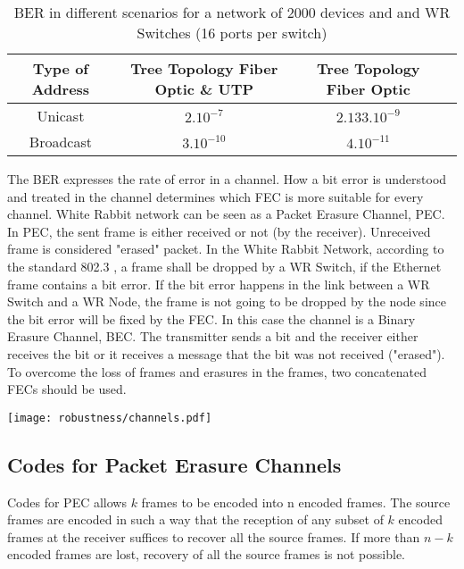 \begin{table}[!ht]
        \begin{center}
                \begin{tabular}{|c|c|c|c|}
		\hline
			 Type of Address & Tree Topology Fiber Optic \& UTP &  Tree Topology Fiber Optic \\ \hline
			 Unicast & $2.10^{-7}$   &  $ 2.133.10^{-9}$ \\ \hline 
			 Broadcast& $3.10^{-10} $ & $4.10^{-11}$ \\ \hline
		\end{tabular}
          \caption{BER in different scenarios for a network of 2000 devices and and WR Switches (16 ports per switch)}
	  \label{tab:BER_WR}
	\end{center}
\end{table}

The BER expresses the rate of error in a channel. How a bit error is
understood and treated in the channel determines which FEC is more suitable for
every channel. White Rabbit network can be seen as a Packet Erasure Channel,
PEC. In PEC, the sent frame is either received or not (by the receiver).
Unreceived frame is considered "erased" packet. In the White Rabbit
Network, according to the standard 802.3 \cite{IEEE8023}, a frame shall be
dropped by a WR Switch, if the Ethernet frame contains a bit error. If the bit
error happens in the link between a WR Switch and a WR Node, the frame is not
going to be dropped by the node since the bit error will be fixed by the FEC. In
this case the channel is a Binary Erasure Channel, BEC. The transmitter sends a
bit and the receiver either receives the bit or it receives a message that the
bit was not received ("erased"). To overcome the loss of frames and erasures in
the frames, two concatenated FECs should be used.

\begin{center}
	\texttt{[image: robustness/channels.pdf]}
	\label{fig:wr_channels}
\end{center}

\subsection{Codes for Packet Erasure Channels}

Codes for PEC allows $k$ frames to be encoded into n encoded frames. The source
frames are encoded in such a way that the reception of any subset of $k$ encoded
frames at the receiver suffices to recover all the source frames. If more
than $n-k$ encoded frames are lost, recovery of all the source frames is not
possible.

